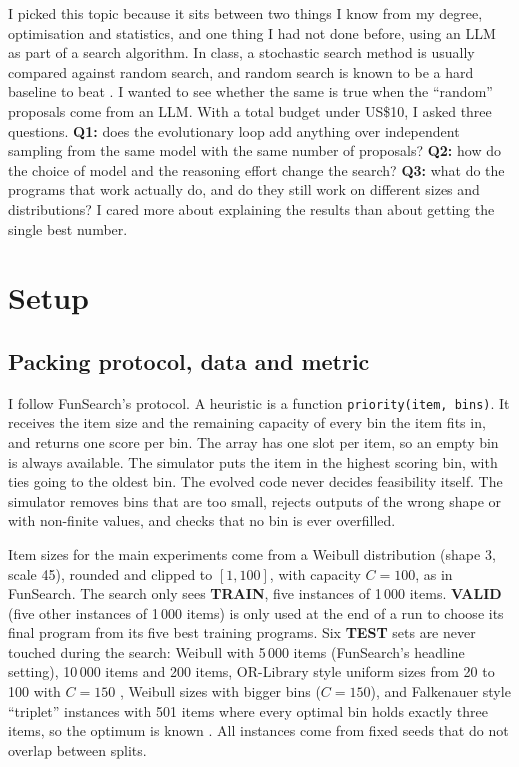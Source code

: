 \documentclass[10pt]{article}
\begin{document}
I picked this topic because it sits between two things I know from my degree, optimisation and
statistics, and one thing I had not done before, using an LLM as part of a search algorithm. In
class, a stochastic search method is usually compared against random search, and random search is
known to be a hard baseline to beat \cite{bergstra2012random}. I wanted to see whether the same is
true when the ``random'' proposals come from an LLM. With a total budget under US\$10, I asked three
questions. \textbf{Q1:} does the evolutionary loop add anything over independent sampling from the
same model with the same number of proposals? \textbf{Q2:} how do the choice of model and the
reasoning effort change the search? \textbf{Q3:} what do the programs that work actually do, and do
they still work on different sizes and distributions? I cared more about explaining the results than
about getting the single best number.

\section{Setup}
\subsection{Packing protocol, data and metric}
I follow FunSearch's protocol. A heuristic is a function \texttt{priority(item, bins)}. It receives
the item size and the remaining capacity of every bin the item fits in, and returns one score per
bin. The array has one slot per item, so an empty bin is always available. The simulator puts the
item in the highest scoring bin, with ties going to the oldest bin. The evolved code never decides
feasibility itself. The simulator removes bins that are too small, rejects outputs of the wrong
shape or with non-finite values, and checks that no bin is ever overfilled.

Item sizes for the main experiments come from a Weibull distribution (shape 3, scale 45), rounded
and clipped to $[1,100]$, with capacity $C=100$, as in FunSearch. The search only sees
\textbf{TRAIN}, five instances of 1\,000 items. \textbf{VALID} (five other instances of 1\,000 items)
is only used at the end of a run to choose its final program from its five best training programs.
Six \textbf{TEST} sets are never touched during the search: Weibull with 5\,000 items (FunSearch's
headline setting), 10\,000 items and 200 items, OR-Library style uniform sizes from 20 to 100 with
$C=150$ \cite{beasley1990orlib}, Weibull sizes with bigger bins ($C=150$), and Falkenauer style
``triplet'' instances with 501 items where every optimal bin holds exactly three items, so the
optimum is known \cite{falkenauer1996hybrid}. All instances come from fixed seeds that do not overlap
between splits.
\end{document}
